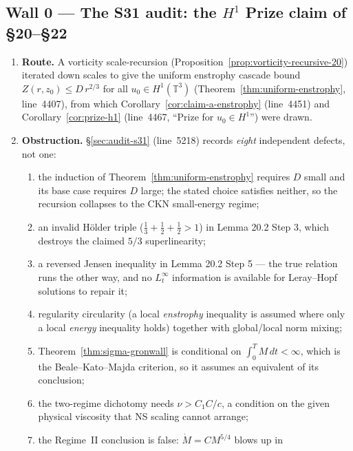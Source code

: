 \documentclass[11pt]{article}
\theoremstyle{definition}
\theoremstyle{remark}
\newcommand{\T}{\mathbb{T}}
\begin{document}
\subsection{Wall 0 --- The S31 audit: the \texorpdfstring{$H^1$}{H1} Prize
claim of \S20--\S22}
\label{subsec:wall0-s31}

\begin{enumerate}[label=(\alph*),leftmargin=2.2em]
  \item \textbf{Route.} A vorticity scale-recursion
    (Proposition~\ref{prop:vorticity-recursive-20}) iterated down scales to
    give the uniform enstrophy cascade bound
    $Z(r,z_0)\leq D\,r^{2/3}$ for all $u_0\in H^1(\T^3)$
    (Theorem~\ref{thm:uniform-enstrophy}, line~4407), from which
    Corollary~\ref{cor:claim-a-enstrophy} (line~4451) and
    Corollary~\ref{cor:prize-h1} (line~4467, ``Prize for $u_0\in H^1$'')
    were drawn.
  \item \textbf{Obstruction.} \S\ref{sec:audit-s31} (line~5218) records
    \emph{eight} independent defects, not one:
    \begin{enumerate}[label=\textup{D\arabic*.},leftmargin=2.6em]
      \item the induction of Theorem~\ref{thm:uniform-enstrophy} requires
        $D$ small and its base case requires $D$ large; the stated choice
        satisfies neither, so the recursion collapses to the CKN small-energy
        regime;
      \item an invalid H\"older triple ($\tfrac13+\tfrac12+\tfrac12>1$) in
        Lemma 20.2 Step 3, which destroys the claimed $5/3$ superlinearity;
      \item a reversed Jensen inequality in Lemma 20.2 Step 5 --- the true
        relation runs the other way, and no $L^\infty_t$ information is
        available for Leray--Hopf solutions to repair it;
      \item regularity circularity (a local \emph{enstrophy} inequality is
        assumed where only a local \emph{energy} inequality holds) together
        with global/local norm mixing;
      \item Theorem~\ref{thm:sigma-gronwall} is conditional on
        $\int_0^TM\,dt<\infty$, which is the Beale--Kato--Majda criterion, so
        it assumes an equivalent of its conclusion;
      \item the two-regime dichotomy needs $\nu>C_1C/c$, a condition on the
        given physical viscosity that NS scaling cannot arrange;
      \item the Regime~II conclusion is false: $\dot M=CM^{5/4}$ blows up in

\end{enumerate}
\end{enumerate}
\end{document}
